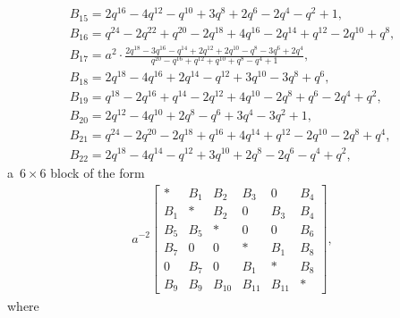 \documentclass[pdftex]{sigma}
\numberwithin{equation}{section}
\theoremstyle{definition}
\newcommand{\flac}[2]{#1}
\begin{document}
\begin{gather*}
 B_{15} =
\flac{2q^{16}}{a^2}-\flac{4q^{12}}{a^2}-\flac{q^{10}}{a^2}+\flac{3q^{8}}{a^2}+\flac{2q^{6}}{a^2}-\flac{2q^{4}}{a^2}-\flac{q^{2}}{a^2}+\flac{1}{a^2}, \\
 B_{16} =
\flac{q^{24}}{a^2}-\flac{2q^{22}}{a^2}+\flac{q^{20}}{a^2}-\flac{2q^{18}}{a^2}+\flac{4q^{16}}{a^2}-\flac{2q^{14}}{a^2}+\flac{q^{12}}{a^2}-\flac{2q^{10}}{a^2}+\flac{q^{8}}{a^2}, \\
 B_{17} =
a^2 \cdot \frac{2q^{18}-3q^{16}-q^{14}+2q^{12}+2q^{10}-q^{8}-3q^{6}+2q^{4}}{q^{20}-q^{16}+q^{12}+q^{10}+q^{8}-q^{4}+1},\\
 B_{18} =
\flac{2q^{18}}{a^2}-\flac{4q^{16}}{a^2}+\flac{2q^{14}}{a^2}-\flac{q^{12}}{a^2}+\flac{3q^{10}}{a^2}-\flac{3q^{8}}{a^2}+\flac{q^{6}}{a^2}, \\
 B_{19} =
\flac{q^{18}}{a^2}-\flac{2q^{16}}{a^2}+\flac{q^{14}}{a^2}-\flac{2q^{12}}{a^2}+\flac{4q^{10}}{a^2}-\flac{2q^{8}}{a^2}+\flac{q^{6}}{a^2}-\flac{2q^{4}}{a^2}+\flac{q^{2}}{a^2}, \\
 B_{20} =
\flac{2q^{12}}{a^2}-\flac{4q^{10}}{a^2}+\flac{2q^{8}}{a^2}-\flac{q^{6}}{a^2}+\flac{3q^{4}}{a^2}-\flac{3q^{2}}{a^2}+\flac{1}{a^2}, \\
 B_{21} =
\flac{q^{24}}{a^2}-\flac{2q^{20}}{a^2}-\flac{2q^{18}}{a^2}+\flac{q^{16}}{a^2}+\flac{4q^{14}}{a^2}+\flac{q^{12}}{a^2}-\flac{2q^{10}}{a^2}-\flac{2q^{8}}{a^2}+\flac{q^{4}}{a^2}, \\
 B_{22} =
\flac{2q^{18}}{a^2}-\flac{4q^{14}}{a^2}-\flac{q^{12}}{a^2}+\flac{3q^{10}}{a^2}+\flac{2q^{8}}{a^2}-\flac{2q^{6}}{a^2}-\flac{q^{4}}{a^2}+\flac{q^{2}}{a^2},
\end{gather*}
a~$6 \times 6$ block of the form
\begin{align*}
 a^{-2}\begin{bmatrix}
 * & B_1 & B_2 & B_3 & 0 & B_4 \\
 B_1 & * & B_2 & 0 & B_3 & B_4 \\
 B_5 & B_5 & * & 0 & 0 & B_6 \\
 B_7 & 0 & 0 & * & B_1 & B_8 \\
 0 & B_7 & 0 & B_1 & * & B_8 \\
 B_9 & B_9 & B_{10} & B_{11} & B_{11} & *
 \end{bmatrix},
\end{align*}
where
\end{document}
